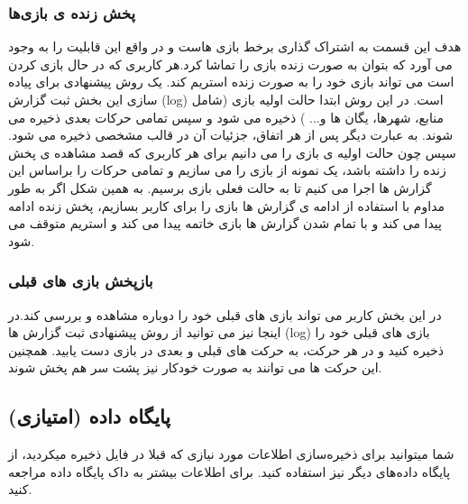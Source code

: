 \documentclass[]{article}
\begin{document}
\subsubsection*{{\titr پخش زنده ی بازی‌ها}}
هدف این قسمت به اشتراک گذاری برخط بازی هاست و در واقع این قابلیت را به وجود می آورد که بتوان به صورت زنده بازی را تماشا کرد.هر کاربری که در حال بازی کردن است می تواند بازی خود را به صورت زنده استریم کند. یک روش پیشنهادی برای پیاده سازی این بخش ثبت گزارش (log) است. در این روش ابتدا حالت اولیه بازی (شامل منابع، شهرها، یگان ها و... ) ذخیره می شود و سپس تمامی حرکات بعدی ذخیره می شوند. به عبارت دیگر پس از هر اتفاق، جزئیات آن در قالب مشخصی ذخیره می شود. سپس چون حالت اولیه ی بازی را می دانیم برای هر کاربری که قصد مشاهده ی پخش زنده را داشته باشد، یک نمونه از بازی را می سازیم و تمامی حرکات را براساس این گزارش ها اجرا می کنیم تا به حالت فعلی بازی برسیم. به همین شکل اگر به طور مداوم با استفاده از ادامه ی گزارش ها بازی را برای کاربر بسازیم، پخش زنده ادامه پیدا می کند و با تمام شدن گزارش ها بازی خاتمه پیدا می کند و استریم متوقف می شود.


\subsubsection*{{\titr بازپخش بازی های قبلی}}
 در این بخش کاربر می تواند بازی های قبلی خود را دوباره مشاهده و بررسی کند.در اینجا نیز می توانید از روش پیشنهادی ثبت گزارش ها (log) بازی های قبلی خود را ذخیره کنید و در هر حرکت، به حرکت های قبلی و بعدی در بازی دست یابید. همچنین این حرکت ها می توانند به صورت خودکار نیز پشت سر هم پخش شوند.
 
 
\subsection*{{\titr پایگاه داده (امتیازی)}}
شما میتوانید برای ذخیره‌سازی اطلاعات مورد نیازی که قبلا در فایل ذخیره میکردید، از پایگاه داده‌های دیگر نیز استفاده کنید. برای اطلاعات بیشتر به داک پایگاه داده مراجعه کنید.
\end{document}
